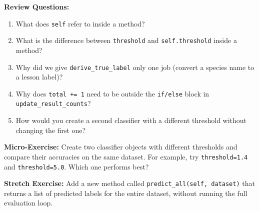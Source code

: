 \textbf{Review Questions:}
\begin{enumerate}
    \item What does \texttt{self} refer to inside a method?
    \item What is the difference between \texttt{threshold} and \texttt{self.threshold} inside a method?
    \item Why did we give \texttt{derive\_true\_label} only one job (convert a species name to a lesson label)?
    \item Why does \texttt{total += 1} need to be outside the \texttt{if/else} block in \texttt{update\_result\_counts}?
    \item How would you create a second classifier with a different threshold without changing the first one?
\end{enumerate}

\textbf{Micro-Exercise:} Create two classifier objects with different thresholds and compare their accuracies on the same dataset.
For example, try \texttt{threshold=1.4} and \texttt{threshold=5.0}.
Which one performs best?

\textbf{Stretch Exercise:} Add a new method called \texttt{predict\_all(self, dataset)} that returns a list of predicted labels for the entire dataset, without running the full evaluation loop.
